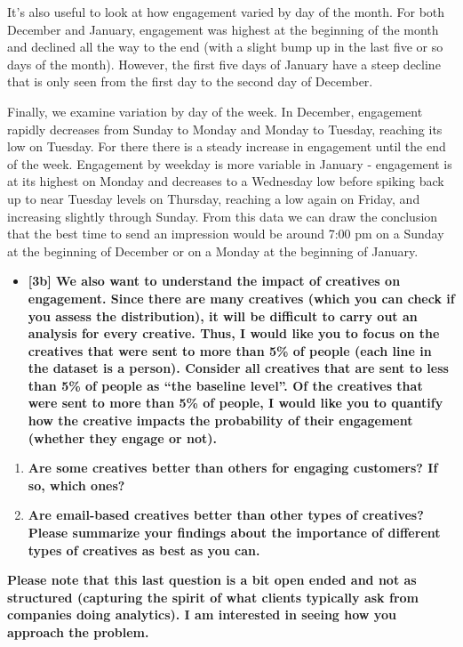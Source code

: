 \documentclass[10pt, oneside,spanish]{article}
\begin{document}
It's also useful to look at how engagement varied by day of the month.  For both December and January, engagement was highest at the beginning of the month and declined all the way to the end (with a slight bump up in the last five or so days of the month).  However, the first five days of January have a steep decline that is only seen from the first day to the second day of December.  

Finally, we examine variation by day of the week.  In December, engagement rapidly decreases from Sunday to Monday and Monday to Tuesday, reaching its low on Tuesday.  For there there is a steady increase in engagement until the end of the week.  Engagement by weekday is more variable in January - engagement is at its highest on Monday and decreases to a Wednesday low before spiking back up to near Tuesday levels on Thursday, reaching a low again on Friday, and increasing slightly through Sunday.  From this data we can draw the conclusion that the best time to send an impression would be around 7:00 pm on a Sunday at the beginning of December or on a Monday at the beginning of January.   


\begin{itemize}
\item \textbf{[3b]   We also want to understand the impact of creatives on engagement. Since there are many creatives (which you can check if you assess the distribution), it will be difficult to carry out an analysis for every creative. Thus, I would like you to focus on the creatives that were sent to more than 5\% of people (each line in the dataset is a person). Consider all creatives that are sent to less than 5\% of people as “the baseline level”. Of the creatives that were sent to more than 5\% of people, I would like you to quantify how the creative impacts the probability of their engagement (whether they engage or not).    }
\end{itemize}


\begin{enumerate}
\item \textbf{Are some creatives better than others for engaging customers? If so, which ones? }
\item \textbf{Are email-based creatives better than other types of creatives? Please summarize your findings about the importance of different types of creatives as best as you can.  }
\end{enumerate}

\textbf{Please note that this last question is a bit open ended and not as structured (capturing the spirit of what clients typically ask from companies doing analytics). I am interested in seeing how you approach the problem.} 
\end{document}
